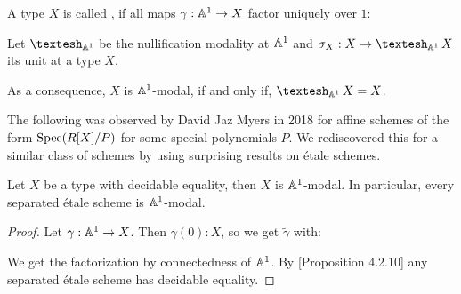 \begin{definition}
  A type $X$ is called , if all maps $\gamma:\mathbb{A}^1\to X$ factor uniquely over $1$:
  \begin{center}
  \end{center}
\end{definition}

\begin{definition}
  Let $\shape_{\A^1}$ be the nullification modality at $\mathbb{A}^1$ and $\sigma_X:X\to \shape_{\A^1}X$ its unit at a type $X$. 
\end{definition}

As a consequence, $X$ is $\mathbb{A}^1$-modal, if and only if, $\shape_{\A^1}X=X$.

The following was observed by David Jaz Myers in 2018 for affine schemes of the form $\operatorname{Spec} (R[X]/P)$ for some special polynomials $P$.
We rediscovered this for a similar class of schemes by using surprising results on étale schemes.

\begin{proposition}
  Let $X$ be a type with decidable equality, then $X$ is $\mathbb{A}^1$-modal.
  In particular, every separated étale scheme is $\mathbb{A}^1$-modal.
\end{proposition}

\begin{proof}
  Let $\gamma:\mathbb{A}^1\to X$.
  Then $\gamma(0):X$, so we get $\tilde{\gamma}$ with:
  \begin{center}
  \end{center}
  We get the factorization by connectedness of $\mathbb{A}^1$.
  By \cite{etale-draft}[Proposition 4.2.10] any separated étale scheme has decidable equality.
\end{proof}